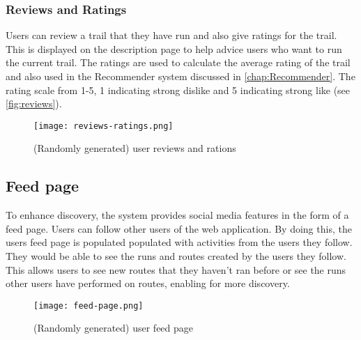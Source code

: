 \subsubsection{Reviews and Ratings}
Users can review a trail that they have run and also give ratings for the trail. This is displayed on the description page to help advice users who want to run the current trail. The ratings are used to calculate the average rating of the trail and also used in the Recommender system discussed in \autoref{chap:Recommender}. The rating scale \cite{wright1982rating} from 1-5, 1 indicating strong dislike and 5 indicating strong like (see \autoref{fig:reviews}).

\begin{figure}[htb!]
    \centering
    \texttt{[image: reviews-ratings.png]}
    \caption{(Randomly generated) user reviews and rations}
    \label{fig:reviews}
\end{figure}

\subsection{Feed page}
To enhance discovery, the system provides social media features in the form of a feed page. Users can follow other users of the web application. By doing this, the users feed page is populated populated with activities from the users they follow. They would be able to see the runs and routes created by the users they follow. This allows users to see new routes that they haven't ran before or see the runs other users have performed on routes, enabling for more discovery.

\begin{figure}[htb!]
    \centering
    \texttt{[image: feed-page.png]}
    \caption{(Randomly generated) user feed page}
    \label{fig:feedPage}
\end{figure}




